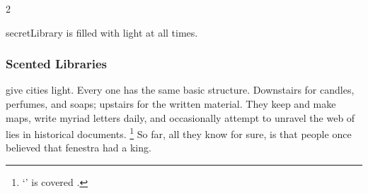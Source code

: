 \begin{multicols}{2}
\begin{description}
    \Gls{secretLibrary} is filled with light at all times.
  \fi
\end{description}

\subsubsection{Scented Libraries}
give cities light.
Every one has the same basic structure.
Downstairs for candles, perfumes, and soaps; upstairs for the written material.
They keep and make maps, write myriad letters daily, and occasionally attempt to unravel the web of lies in historical documents.%
\footnote{`' is covered .}
So far, all they know for sure, is that people once believed that \gls{fenestra} had a king.

\end{multicols}

